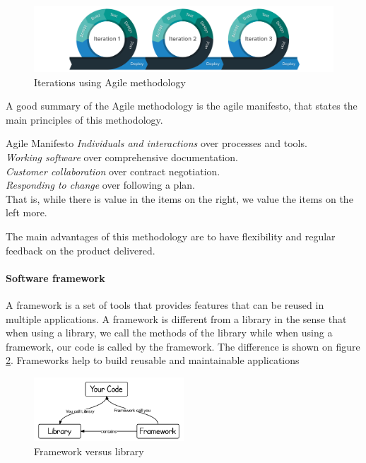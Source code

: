 \begin{figure}
    \centering
    \includegraphics[width=\textwidth]{images/agile-methodolody.png}
    \caption{Iterations using Agile methodology}
    \label{fig:agile-methodology}
\end{figure}

A good summary of the Agile methodology is the agile manifesto\cite{agilemanifesto}, that states the main principles of this methodology.

\begin{bclogo}[logo=\bctrombone]{Agile Manifesto \cite{agilemanifesto}}
\emph{Individuals and interactions} over processes and tools.\\
\emph{Working software} over comprehensive documentation.\\
\emph{Customer collaboration} over contract negotiation.\\
\emph{Responding to change} over following a plan. \\
That is, while there is value in the items on
the right, we value the items on the left more.
\end{bclogo}

The main advantages of this methodology are to have flexibility and regular feedback on the product delivered.

\paragraph{Software framework}

A framework is a set of tools that provides features that can be reused in multiple applications. A framework is different from a library in the sense that when using a library, we call the methods of the library while when using a framework, our code is called by the framework. The difference is shown on figure \ref{fig:framework-vs-library}. Frameworks help to build reusable and maintainable applications 

\begin{figure}
    \centering
    \includegraphics[width=0.5\textwidth]{images/framework-vs-library.png}
    \caption{Framework versus library}
    \label{fig:framework-vs-library}
\end{figure}

